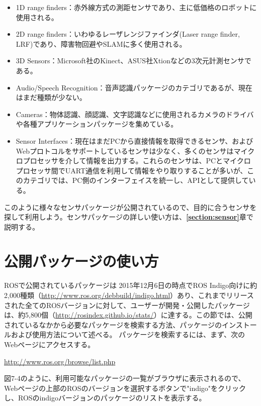 \begin{itemize}
\item 1D range finders：赤外線方式の測距センサであり、主に低価格のロボットに使用される。
\item 2D range finders：いわゆるレーザレンジファインダ(Laser range finder, LRF)であり、障害物回避やSLAMに多く使用される。
\item 3D Sensors：Microsoft社のKinect、ASUS社Xtionなどの3次元計測センサである。
\item Audio/Speech Recognition：音声認識パッケージのカテゴリであるが、現在はまだ種類が少ない。
\item Cameras：物体認識、顔認識、文字認識などに使用されるカメラのドライバや各種アプリケーションパッケージを集めている。
\item Sensor Interfaces：現在はまだPCから直接情報を取得できるセンサ、およびWebプロトコルをサポートしているセンサは少なく、多くのセンサはマイクロプロセッサを介して情報を出力する。これらのセンサは、PCとマイクロプロセッサ間でUART通信を利用して情報をやり取りすることが多いが、このカテゴリでは、PC側のインターフェイスを統一し、APIとして提供している。
\end{itemize}

このように様々なセンサパッケージが公開されているので、目的に合うセンサを探して利用しよう。センサパッケージの詳しい使い方は、\textbf{\ref{section:sensor}}章で説明する。

\section{公開パッケージの使い方}

ROSで公開されているパッケージは 2015年12月6日の時点でROS Indigo向けに約2,000種類（\url{http://www.ros.org/debbuild/indigo.html}）あり、これまでリリースされた全てのROSバージョンに対して、ユーザーが開発・公開したパッケージは、約5,800個（\url{http://rosindex.github.io/stats/}）に達する。この節では、公開されているなかから必要なパッケージを検索する方法、パッケージのインストールおよび使用方法について述べる。
パッケージを検索するには、まず、次のWebページにアクセスする。

\vspace{\baselineskip}
\url{http://www.ros.org/browse/list.php}
\vspace{\baselineskip}

図7-4のように、利用可能なパッケージの一覧がブラウザに表示されるので、Webページの上部のROSのバージョンを選択するボタンで"indigo"をクリックし、ROSのindigoバージョンのパッケージのリストを表示する。


